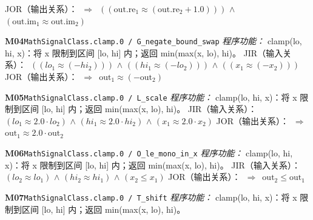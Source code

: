 \documentclass[11pt]{article}
\begin{document}
\hspace*{1.5em}JOR（输出关系）：\ $\Rightarrow$\ $((\mathrm{out.re}_{1} \approx  (\mathrm{out.re}_{2} + 1.0)))$ $\wedge$ $(\mathrm{out.im}_{1} \approx  \mathrm{out.im}_{2})$\par\medskip
\textbf{M04}\quad \texttt{MathSignalClass.clamp.0 / G\_negate\_bound\_swap}\newline
\hspace*{1.5em}\emph{程序功能：} clamp(lo, hi, x)：将 x 限制到区间 [lo, hi] 内；返回 min(max(x, lo), hi)。\newline
\hspace*{1.5em}JIR（输入关系）：\ $((lo_{1} \approx  (-hi_{2})))$ $\wedge$ $((hi_{1} \approx  (-lo_{2})))$ $\wedge$ $((x_{1} \approx  (-x_{2})))$\newline
\hspace*{1.5em}JOR（输出关系）：\ $\Rightarrow$\ $\mathrm{out}_{1} \approx  (-\mathrm{out}_{2})$\par\medskip
\textbf{M05}\quad \texttt{MathSignalClass.clamp.0 / L\_scale}\newline
\hspace*{1.5em}\emph{程序功能：} clamp(lo, hi, x)：将 x 限制到区间 [lo, hi] 内；返回 min(max(x, lo), hi)。\newline
\hspace*{1.5em}JIR（输入关系）：\ $(lo_{1} \approx  2.0\cdot lo_{2})$ $\wedge$ $(hi_{1} \approx  2.0\cdot hi_{2})$ $\wedge$ $(x_{1} \approx  2.0\cdot x_{2})$\newline
\hspace*{1.5em}JOR（输出关系）：\ $\Rightarrow$\ $\mathrm{out}_{1} \approx  2.0\cdot \mathrm{out}_{2}$\par\medskip
\textbf{M06}\quad \texttt{MathSignalClass.clamp.0 / O\_le\_mono\_in\_x}\newline
\hspace*{1.5em}\emph{程序功能：} clamp(lo, hi, x)：将 x 限制到区间 [lo, hi] 内；返回 min(max(x, lo), hi)。\newline
\hspace*{1.5em}JIR（输入关系）：\ $(lo_{2} \approx  lo_{1})$ $\wedge$ $(hi_{2} \approx  hi_{1})$ $\wedge$ $(x_{2}\leq x_{1})$\newline
\hspace*{1.5em}JOR（输出关系）：\ $\Rightarrow$\ $\mathrm{out}_{2}\leq \mathrm{out}_{1}$\par\medskip
\textbf{M07}\quad \texttt{MathSignalClass.clamp.0 / T\_shift}\newline
\hspace*{1.5em}\emph{程序功能：} clamp(lo, hi, x)：将 x 限制到区间 [lo, hi] 内；返回 min(max(x, lo), hi)。\newline
\end{document}
